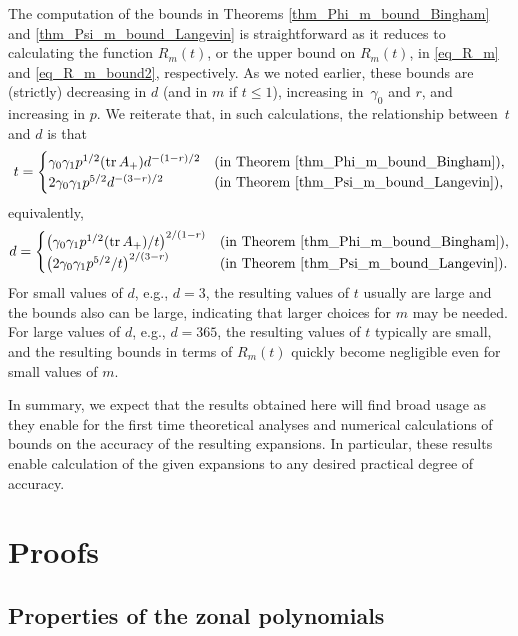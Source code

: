 \documentclass[pdftex]{sigma}
\numberwithin{equation}{section}
\def\tr {\mathop{\mathrm{tr}}}
\begin{document}
The computation of the bounds in Theorems \ref{thm_Phi_m_bound_Bingham} and \ref{thm_Psi_m_bound_Langevin} is straightforward as it reduces to calculating the function $R_m(t)$, or the upper bound on $R_m(t)$, in \eqref{eq_R_m} and \eqref{eq_R_m_bound2}, respectively. As we noted earlier, these bounds are (strictly) decreasing in $d$ (and in $m$ if $t \le 1$), increasing in~$\gamma_0$ and $r$, and increasing in $p$. We reiterate that, in such calculations, the relationship between~$t$ and $d$ is that
\[
t = \begin{cases}
\gamma_0 \gamma_1 p^{1/2} (\tr A_+) d^{-(1-r)/2} & (\hbox{in Theorem \ref{thm_Phi_m_bound_Bingham}}), \\
2 \gamma_0 \gamma_1 p^{5/2} d^{-(3-r)/2} & (\hbox{in Theorem \ref{thm_Psi_m_bound_Langevin}}),
\end{cases}
\]
equivalently,
\[
d = \begin{cases}
\bigl(\gamma_0 \gamma_1 p^{1/2} (\tr A_+)/t\bigr)^{2/(1-r)} & (\hbox{in Theorem \ref{thm_Phi_m_bound_Bingham}}),\\
\bigl(2 \gamma_0 \gamma_1 p^{5/2}/t\bigr)^{2/(3-r)} & (\hbox{in Theorem \ref{thm_Psi_m_bound_Langevin}}).
\end{cases}
\]
For small values of $d$, e.g., $d=3$, the resulting values of $t$ usually are large and the bounds also can be large, indicating that larger choices for $m$ may be needed. For large values of $d$, e.g., $d=365$, the resulting values of $t$ typically are small, and the resulting bounds in terms of $R_m(t)$ quickly become negligible even for small values of $m$.

In summary, we expect that the results obtained here will find broad usage as they enable for the first time theoretical analyses and numerical calculations of bounds on the accuracy of the resulting expansions. In particular, these results enable calculation of the given expansions to any desired practical degree of accuracy.

\section{Proofs}\label{sec_proofs}

\subsection{Properties of the zonal polynomials}\label{sec_zonal_polys}
\end{document}
